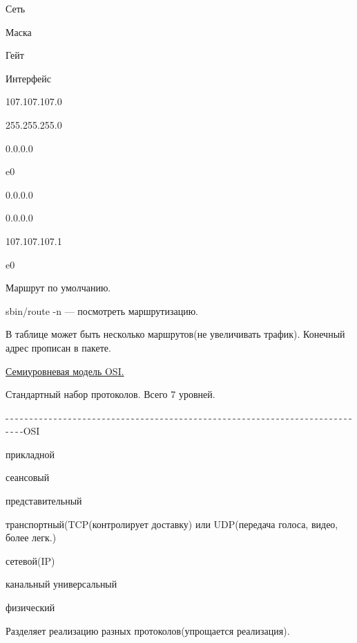 	
	
	
		
			\par Сеть
		
		
			\par Маска
		
		
			\par Гейт
		
		
			\par Интерфейс
		
	
	
		
			\par 107.107.107.0
		
		
			\par 255.255.255.0
		
		
			\par 0.0.0.0
		
		
			\par e0
		
	
	
		
			\par 0.0.0.0
		
		
			\par 0.0.0.0
		
		
			\par 107.107.107.1
		
		
			\par e0
		
	

\par 
Маршрут
по умолчанию.
\par 
sbin/route -n — посмотреть маршрутизацию.
\par 
В таблице может быть несколько
маршрутов(не увеличивать трафик).
Конечный адрес прописан в пакете.
\par 


\par 
\underline{Семиуровневая модель OSI.}
\par 
Стандартный набор протоколов.
Всего 7 уровней.
\par 
-$\,$-$\,$-$\,$-$\,$-$\,$-$\,$-$\,$-$\,$-$\,$-$\,$-$\,$-$\,$-$\,$-$\,$-$\,$-$\,$-$\,$-$\,$-$\,$-$\,$-$\,$-$\,$-$\,$-$\,$-$\,$-$\,$-$\,$-$\,$-$\,$-$\,$-$\,$-$\,$-$\,$-$\,$-$\,$-$\,$-$\,$-$\,$-$\,$-$\,$-$\,$-$\,$-$\,$-$\,$-$\,$-$\,$-$\,$-$\,$-$\,$-$\,$-$\,$-$\,$-$\,$-$\,$-$\,$-$\,$-$\,$-$\,$-$\,$-$\,$-$\,$-$\,$-$\,$-$\,$-$\,$-$\,$-$\,$-$\,$-$\,$-$\,$-$\,$-$\,$-$\,$-$\,$-$\,$-OSI
\par 
прикладной
\par 
сеансовый
\par 
представительный
\par 
транспортный(TCP(контролирует
доставку) или UDP(передача голоса, видео,
более легк.)
\par 
сетевой(IP)
\par канальный
    универсальный
\par 
физический
\par 
Разделяет реализацию разных
протоколов(упрощается реализация).
\par 


